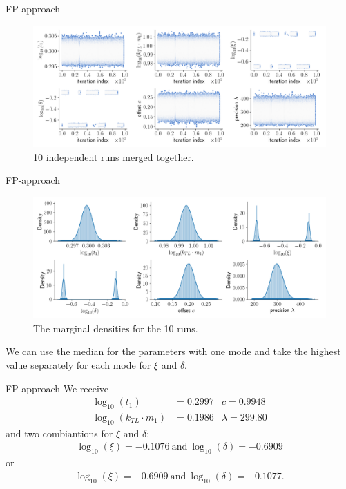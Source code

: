 \documentclass{beamer}
\begin{document}
	\begin{frame}{FP-approach}
		\begin{figure}
			\includegraphics[width=1\columnwidth]
			{plots/mRNA_FP/merged_parameters_mRNA_FP.png}
			\caption{10 independent runs merged together.}
		\end{figure}
	\end{frame}
	
	\begin{frame}{FP-approach}
		\begin{figure}
			\includegraphics[width=1\columnwidth]
			{plots/mRNA_FP/merged_1d_marginals_mRNA_FP.png}
			\caption{The marginal densities for the 10 runs.}
		\end{figure}
		We can use the median for the parameters with one mode and take the 
		highest value separately for each mode for $\xi$ and $\delta$.
	\end{frame}
	
	\begin{frame}{FP-approach}
		We receive
		\begin{align*}
    		\log_{10}(t_1) &= 0.2997 &c = 0.9948 \\
    		\log_{10}(k_{TL} \cdot m_1) &= 0.1986 &\lambda = 299.80
		\end{align*}
		and two combiantions for $\xi$ and $\delta$:
		\begin{align*}
    		\log_{10}(\xi) = -0.1076 \ \text{and} \ \log_{10}(\delta) = -0.6909
		\end{align*}
		or
		\begin{align*}
    		\log_{10}(\xi) = -0.6909 \ \text{and} \ \log_{10}(\delta) = -0.1077.
		\end{align*}
	\end{frame}
\end{document}
